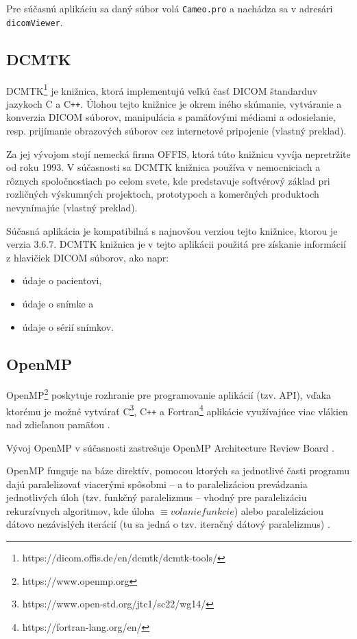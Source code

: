 Pre súčasnú aplikáciu sa daný súbor volá \texttt{Cameo.pro} a nachádza sa v adresári \texttt{dicomViewer}.

\clearpage

\subsection {DCMTK}\label{dcmtk}
DCMTK\footnote{https://dicom.offis.de/en/dcmtk/dcmtk-tools/} je knižnica, ktorá implementujú veľkú časť DICOM štandardu\newline v jazykoch C a C\texttt{++}. Úlohou tejto knižnice je okrem iného skúmanie, vytváranie a konverzia DICOM súborov, manipulácia s pamäťovými médiami a odosielanie, resp. prijímanie obrazových súborov cez internetové pripojenie \cite{dcmtk_description} (vlastný preklad).

Za jej vývojom stojí nemecká firma OFFIS, ktorá túto knižnicu vyvíja nepretržite od roku 1993. V súčasnosti sa DCMTK knižnica používa v nemocniciach a rôznych spoločnostiach po celom svete, kde predstavuje softvérový základ pri rozličných výskumných projektoch, prototypoch a komerčných produktoch nevynímajúc \cite{dcmtk_description} (vlastný preklad).

Súčasná aplikácia je kompatibilná s najnovšou verziou tejto knižnice, ktorou je verzia 3.6.7. DCMTK knižnica je v tejto aplikácii použitá pre získanie informácií z hlavičiek DICOM súborov, ako napr:

\begin{itemize}
\item {údaje o pacientovi,}
\item {údaje o snímke a}
\item {údaje o sérií snímkov.}
\end{itemize}

\subsection {OpenMP}\label{openmp}
OpenMP\footnote{https://www.openmp.org} poskytuje rozhranie pre programovanie aplikácií (tzv. API), vďaka ktorému je možné vytvárať C\footnote{https://www.open-std.org/jtc1/sc22/wg14/}, C\texttt{++} a Fortran\footnote{https://fortran-lang.org/en/} aplikácie využívajúce viac vlákien nad zdieľanou pamäťou \cite{openmp_description}.

Vývoj OpenMP v súčasnosti zastrešuje OpenMP Architecture Review Board \cite{openmp_description}.

OpenMP funguje na báze direktív, pomocou ktorých sa jednotlivé časti programu dajú paralelizovať viacerými spôsobmi -- a to paralelizáciou prevádzania jednotlivých úloh (tzv. funkčný paralelizmus -- vhodný pre paralelizáciu rekurzívnych algoritmov, kde úloha $\equiv{ volanie funkcie}$) alebo paralelizáciou dátovo nezávislých iterácií (tu sa jedná o tzv. iteračný dátový paralelizmus) \cite{openmp_description}.

